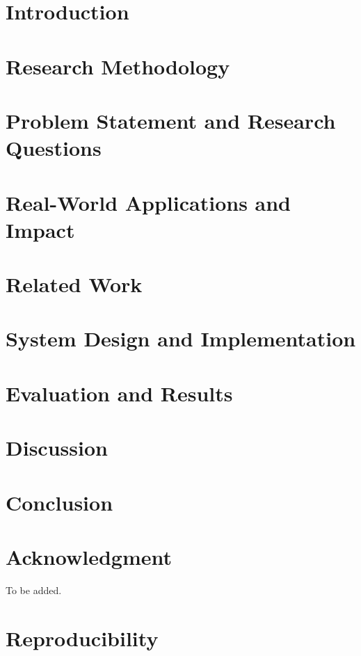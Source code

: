 \documentclass[conference]{IEEEtran}
\begin{document}
\section{Introduction}


\section{Research Methodology}


\section{Problem Statement and Research Questions}


\section{Real-World Applications and Impact}


\section{Related Work}
\label{sec:related}



\section{System Design and Implementation}
\label{sec:system-design}




\section{Evaluation and Results}
\label{sec:evaluation}



\section{Discussion}


\section{Conclusion}


\section*{Acknowledgment}
To be added.

\section{Reproducibility}




\end{document}
